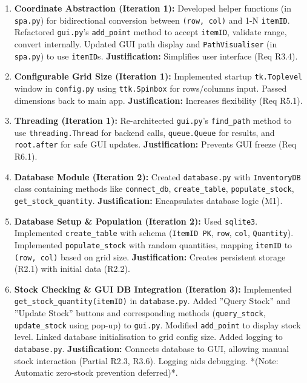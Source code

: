 \begin{enumerate}
	\item \textbf{Coordinate Abstraction (Iteration 1):} Developed helper functions (in \texttt{spa.py}) for bidirectional conversion between \texttt{(row, col)} and 1-N \texttt{itemID}. Refactored \texttt{gui.py}'s \texttt{add\_point} method to accept \texttt{itemID}, validate range, convert internally. Updated GUI path display and \texttt{PathVisualiser} (in \texttt{spa.py}) to use \texttt{itemID}s. \textbf{Justification:} Simplifies user interface (Req R3.4).
	\item \textbf{Configurable Grid Size (Iteration 1):} Implemented startup \texttt{tk.Toplevel} window in \texttt{config.py} using \texttt{ttk.Spinbox} for rows/columns input. Passed dimensions back to main app. \textbf{Justification:} Increases flexibility (Req R5.1).
	\item \textbf{Threading (Iteration 1):} Re-architected \texttt{gui.py}'s \texttt{find\_path} method to use \texttt{threading.Thread} for backend calls, \texttt{queue.Queue} for results, and \texttt{root.after} for safe GUI updates. \textbf{Justification:} Prevents GUI freeze (Req R6.1).
	\item \textbf{Database Module (Iteration 2):} Created \texttt{database.py} with \texttt{InventoryDB} class containing methods like \texttt{connect\_db}, \texttt{create\_table}, \texttt{populate\_stock}, \texttt{get\_stock\_quantity}. \textbf{Justification:} Encapsulates database logic (M1).
	\item \textbf{Database Setup \& Population (Iteration 2):} Used \texttt{sqlite3}. Implemented \texttt{create\_table} with schema (\texttt{ItemID PK}, \texttt{row}, \texttt{col}, \texttt{Quantity}). Implemented \texttt{populate\_stock} with random quantities, mapping \texttt{itemID} to \texttt{(row, col)} based on grid size. \textbf{Justification:} Creates persistent storage (R2.1) with initial data (R2.2).
	\item \textbf{Stock Checking \& GUI DB Integration (Iteration 3):} Implemented \texttt{get\_stock\_quantity(itemID)} in \texttt{database.py}. Added ''Query Stock'' and ''Update Stock'' buttons and corresponding methods (\texttt{query\_stock}, \texttt{update\_stock} using pop-up) to \texttt{gui.py}. Modified \texttt{add\_point} to display stock level. Linked database initialisation to grid config size. Added logging to \texttt{database.py}. \textbf{Justification:} Connects database to GUI, allowing manual stock interaction (Partial R2.3, R3.6). Logging aids debugging. *(Note: Automatic zero-stock prevention deferred)*.
\end{enumerate}

